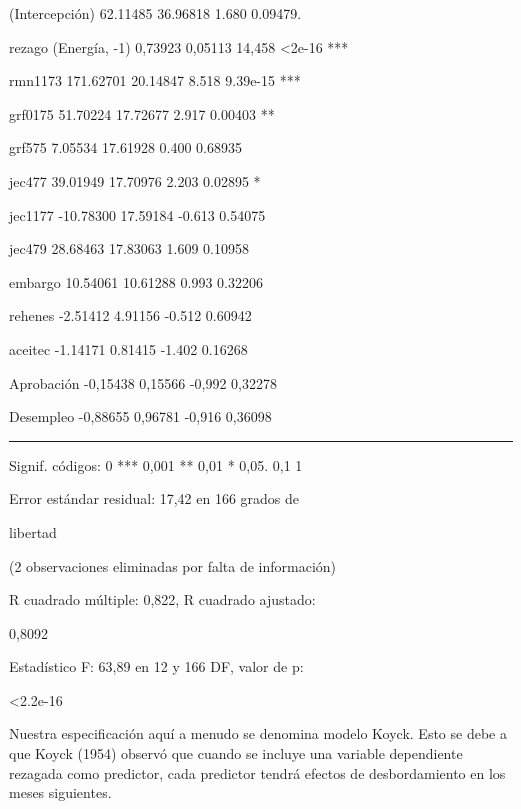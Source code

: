 \documentclass[
]{book}
\begin{document}
(Intercepción) 62.11485 36.96818 1.680 0.09479.

rezago (Energía, -1) 0,73923 0,05113 14,458 \textless2e-16 ***

rmn1173 171.62701 20.14847 8.518 9.39e-15 ***

grf0175 51.70224 17.72677 2.917 0.00403 **

grf575 7.05534 17.61928 0.400 0.68935

jec477 39.01949 17.70976 2.203 0.02895 *

jec1177 -10.78300 17.59184 -0.613 0.54075

jec479 28.68463 17.83063 1.609 0.10958

embargo 10.54061 10.61288 0.993 0.32206

rehenes -2.51412 4.91156 -0.512 0.60942

aceitec -1.14171 0.81415 -1.402 0.16268

Aprobación -0,15438 0,15566 -0,992 0,32278

Desempleo -0,88655 0,96781 -0,916 0,36098

\begin{center}\rule{0.5\linewidth}{0.5pt}\end{center}

Signif. códigos: 0 *** 0,001 ** 0,01 * 0,05. 0,1 1

Error estándar residual: 17,42 en 166 grados de

libertad

(2 observaciones eliminadas por falta de información)

R cuadrado múltiple: 0,822, R cuadrado ajustado:

0,8092

Estadístico F: 63,89 en 12 y 166 DF, valor de p:

\textless2.2e-16

Nuestra especificación aquí a menudo se denomina modelo Koyck. Esto se debe a que Koyck (1954) observó que cuando se incluye una variable dependiente rezagada como predictor, cada predictor tendrá efectos de desbordamiento en los meses siguientes.
\end{document}
